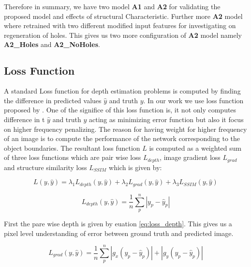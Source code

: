 Therefore in summary, we have two model \textbf{A1} and \textbf{A2} for validating the proposed model and effects of structural Characteristic. Further more \textbf{A2} model where retrained with two different modified input features for investigating on regeneration of holes. This gives us two more configuration of \textbf{A2} model namely \textbf{A2\_Holes} and \textbf{A2\_NoHoles}. 

\newpage
\subsection{Loss Function}
A standard Loss function for depth estimation problems is computed by finding the difference in predicted values \(\hat{y}\) and truth \(y\). In our work we use loss function proposed by \cite{Alhashim2018}. One of the significe of this loss function is, it not only computes difference in t \(\hat{y}\) and truth \(y\) acting as minimizing error function but also it focus on higher frequency penalizing. The reason for having weight for higher frequency of an image is to compute the performance of the network corresponding to the object boundaries. The resultant loss function \(L\) is computed as a weighted sum of three loss functions which are pair wise loss \(L_{depth}\), image gradient loss \(L_{grad}\) and structure similarity loss  \(L_{SSIM}\) which is given by:


\begin{equation} \label{eq:loss}
       L(y, \hat{y}) = \lambda_{1} L_{depth}(y, \hat{y}) + \lambda_{2} L_{grad}(y, \hat{y}) + \lambda_{3} L_{SSIM}(y, \hat{y})
\end{equation}






\begin{equation} \label{eq:loss_depth}
      L_{depth}(y, \hat{y})= \frac{1}{n} \sum_{p}^{n} \left|y_{p} - \hat{y}_{p} \right|
\end{equation}

First the pare wise depth is given by euation \ref{eq:loss_depth}. This gives us a pixel level understanding of error between ground truth and predicted image.  

\begin{equation} \label{eq:loss_grad}
       L_{grad}(y, \hat{y}) =  \frac{1}{n} \sum_{p}^{n} \left| g_{x} (y_{p} - \hat{y}_{p}) \right| + \left| g_{y} (y_{p} - \hat{y}_{p}) \right|
\end{equation}


